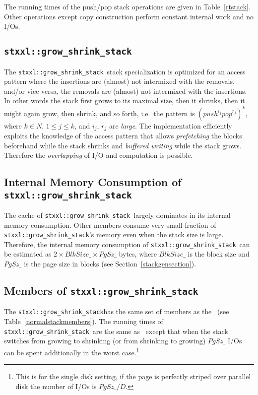 \documentclass[twoside]{book}
\begin{document}
The running times of the push/pop
stack operations are given in Table~\ref{rtstack}. Other operations
except copy construction perform constant internal work and no I/Os.

\newcommand{\xgsstack}{\texttt{stxxl::grow\_shrink\_stack}}
\subsection{\xgsstack}
The \xgsstack\ stack specialization is optimized for an
access pattern where the insertions are (almost) not intermixed with
the removals, and/or vice versa, the removals are (almost) not
intermixed with the insertions. In other words the stack first grows
to its maximal size, then it shrinks, then it might again grow, then
shrink, and so forth, i.e.\ the pattern is
$(push^{i_j}pop^{r_j})^k$, where $k \in N$, $1\leq j\leq k$, and
$i_j$, $r_j$ are \emph{large}. 
The implementation efficiently exploits the knowledge of the access
pattern that allows \emph{prefetching} the blocks beforehand while the stack
shrinks and \emph{buffered writing} while the stack grows. Therefore
the \emph{overlapping} of I/O and computation is possible.

\subsection*{Internal Memory Consumption of \xgsstack}
The cache of \xgsstack\ largely dominates in its internal memory
consumption. Other members consume very small fraction of
\xgsstack 's 
memory even when the stack size is large. Therefore, the internal
memory consumption of \xgsstack\ can be estimated as
$2 \times BlkSize\_ \times PgSz\_$ bytes, where $BlkSize\_$ is the
block size and $PgSz\_$ is the page size in blocks (see
Section~\ref{stackgensection}). 

\subsection*{Members of \xgsstack}
The \xgsstack has the same set of members as the \xnormalstack\  (see
Table~\ref{normalstackmembers}). The running times of \xgsstack\ are the
same as \xnormalstack\ except that when the stack switches from
growing to shrinking (or from shrinking to growing) $PgSz\_$ I/Os can
be spent additionally in the worst case.\footnote{This is for the single
disk setting, if the page is perfectly striped over parallel disk the
number of I/Os is $PgSz\_/D$.}

\newcommand{\xgsstacktwo}{\texttt{stxxl::grow\_shrink\_stack2}}
\end{document}
